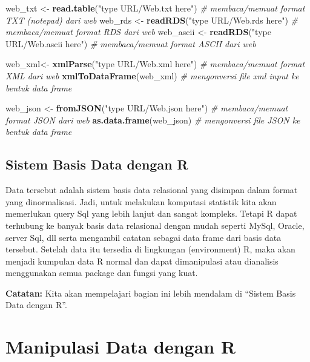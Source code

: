\documentclass[
]{book}
\newenvironment{Shaded}{\begin{snugshade}}{\end{snugshade}}
\newcommand{\CommentTok}[1]{\textcolor[rgb]{0.56,0.35,0.01}{\textit{#1}}}
\newcommand{\KeywordTok}[1]{\textcolor[rgb]{0.13,0.29,0.53}{\textbf{#1}}}
\newcommand{\NormalTok}[1]{#1}
\newcommand{\StringTok}[1]{\textcolor[rgb]{0.31,0.60,0.02}{#1}}
\begin{document}
\begin{Shaded}
\begin{Highlighting}[]
\NormalTok{web_txt <-}\StringTok{ }\KeywordTok{read.table}\NormalTok{(}\StringTok{"type URL/Web.txt here"}\NormalTok{)     }\CommentTok{# membaca/memuat format TXT (notepad) dari web}
\NormalTok{web_rds <-}\StringTok{ }\KeywordTok{readRDS}\NormalTok{(}\StringTok{"type URL/Web.rds here"}\NormalTok{)        }\CommentTok{# membaca/memuat format RDS dari web}
\NormalTok{web_ascii <-}\StringTok{ }\KeywordTok{readRDS}\NormalTok{(}\StringTok{"type URL/Web.ascii here"}\NormalTok{)    }\CommentTok{# membaca/memuat format ASCII dari web}

\NormalTok{web_xml<-}\StringTok{ }\KeywordTok{xmlParse}\NormalTok{(}\StringTok{"type URL/Web.xml here"}\NormalTok{)        }\CommentTok{# membaca/memuat format XML dari web }
\KeywordTok{xmlToDataFrame}\NormalTok{(web_xml)                            }\CommentTok{# mengonversi file xml input ke bentuk data frame}

\NormalTok{web_json <-}\StringTok{ }\KeywordTok{fromJSON}\NormalTok{(}\StringTok{"type URL/Web.json here"}\NormalTok{)     }\CommentTok{# membaca/memuat format JSON dari web}
\KeywordTok{as.data.frame}\NormalTok{(web_json)                            }\CommentTok{# mengonversi file JSON ke bentuk data frame}
\end{Highlighting}
\end{Shaded}

\hypertarget{sistem-basis-data-dengan-r}{%
\section{Sistem Basis Data dengan R}\label{sistem-basis-data-dengan-r}}

Data tersebut adalah sistem basis data relasional yang disimpan dalam format yang dinormalisasi. Jadi, untuk melakukan komputasi statistik kita akan memerlukan query Sql yang lebih lanjut dan sangat kompleks. Tetapi R dapat terhubung ke banyak basis data relasional dengan mudah seperti MySql, Oracle, server Sql, dll serta mengambil catatan sebagai data frame dari basis data tersebut. Setelah data itu tersedia di lingkungan (environment) R, maka akan menjadi kumpulan data R normal dan dapat dimanipulasi atau dianalisis menggunakan semua package dan fungsi yang kuat.

\textbf{Catatan:} Kita akan mempelajari bagian ini lebih mendalam di ``Sistem Basis Data dengan R''.

\hypertarget{Manipulasi-Data-dengan-R}{%
\chapter{Manipulasi Data dengan R}\label{Manipulasi-Data-dengan-R}}
\end{document}
